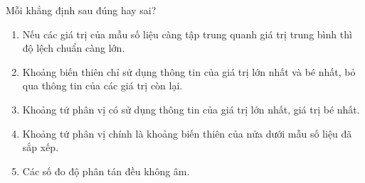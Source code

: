 \begin{bt}%
	Mỗi khẳng định sau đúng hay sai?
	\begin{enumerate}[(1)]
		\item\label{1} Nếu các giá trị của mẫu số liệu càng tập trung quanh giá trị trung bình thì độ lệch chuẩn càng lớn.
		\item\label{2} Khoảng biến thiên chỉ sử dụng thông tin của giá trị lớn nhất và bé nhất, bỏ qua thông tin của các giá trị còn lại.
		\item\label{3} Khoảng tứ phân vị có sử dụng thông tin của giá trị lớn nhất, giá trị bé nhất.
		\item\label{4} Khoảng tứ phân vị chính là khoảng biến thiên của nửa dưới mẫu số liệu đã sắp xếp.
		\item\label{5} Các số đo độ phân tán đều không âm.
	\end{enumerate}
\end{bt}

